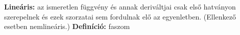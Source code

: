\documentclass[11pt,a4paper]{article}
\begin{document}
    \begin{tcolorbox}[colback=red!5!white,colframe=red!60!black,title= 5. Lineáris állandó együtthatós DE]
        \textbf{Lineáris:} az ismeretlen függvény és annak deriváltjai csak első hatványon szerepelnek és
        ezek szorzatai sem fordulnak elő az egyenletben. (Ellenkező esetben nemlineáris.)
        \textbf{Definíció:} faszom
    \end{tcolorbox}
\end{document}
